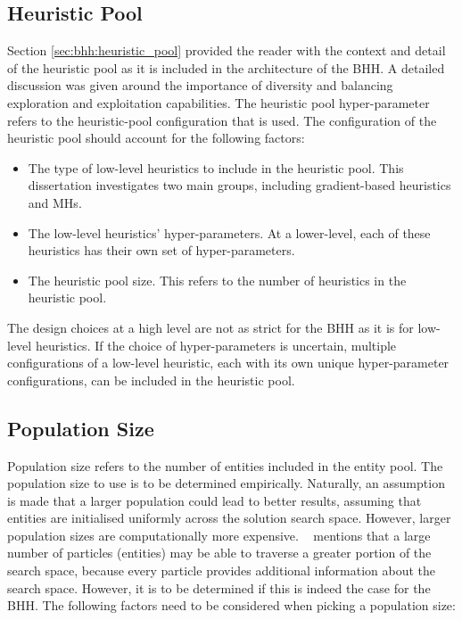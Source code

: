 \subsection{Heuristic Pool}\label{sec:bhh:hyper_parameters:heuristic_pool}

Section \ref{sec:bhh:heuristic_pool} provided the reader with the context and detail of the heuristic pool as it is included in the architecture of the \acs{BHH}. A detailed discussion was given around the importance of diversity and balancing exploration and exploitation capabilities. The heuristic pool hyper-parameter refers to the heuristic-pool configuration that is used. The configuration of the heuristic pool should account for the following factors:

\begin{itemize}
      \item The type of low-level heuristics to include in the heuristic pool. This dissertation investigates two main groups, including gradient-based heuristics and \acp{MH}.

      \item The low-level heuristics' hyper-parameters. At a lower-level, each of these heuristics has their own set of hyper-parameters.

      \item The heuristic pool size. This refers to the number of heuristics in the heuristic pool.
\end{itemize}

The design choices at a high level are not as strict for the \acs{BHH} as it is for low-level heuristics. If the choice of hyper-parameters is uncertain, multiple configurations of a low-level heuristic, each with its own unique hyper-parameter configurations, can be included in the heuristic pool.

\subsection{Population Size}\label{sec:bhh:hyper_parameters:population_size}

Population size refers to the number of entities included in the entity pool. The population size to use is to be determined empirically. Naturally, an assumption is made that a larger population could lead to better results, assuming that entities are initialised uniformly across the solution search space. However, larger population sizes are computationally more expensive. \citeauthor{ref:oldewage:2017}~\cite{ref:oldewage:2017} mentions that a large number of particles (entities) may be able to traverse a greater portion of the search space, because every particle provides additional information about the search space. However, it is to be determined if this is indeed the case for the \acs{BHH}. The following factors need to be considered when picking a population size:

